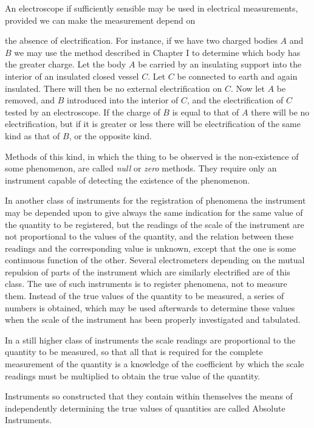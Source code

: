 \documentclass[11pt,a4paper]{article}
\begin{document}
An electroscope if sufficiently sensible may be used in electrical
measurements, provided we can make the measurement depend on

\clearpage

the absence of electrification. For instance, if we have two charged
bodies $A$ and $B$ we may use the method described in Chapter I to
determine which body has the greater charge. Let the body $A$ be
carried by an insulating support into the interior of an insulated
closed vessel $C$. Let $C$ be connected to earth and again insulated.
There will then be no external electrification on $C$. Now let $A$
be removed, and $B$ introduced into the interior of $C$, and the
electrification of $C$ tested by an electroscope. If the charge of $B$
is equal to that of $A$ there will be no electrification, but if it is
greater or less there will be electrification of the same kind as that
of $B$, or the opposite kind.

Methods of this kind, in which the thing to be observed is the
non-existence of some phenomenon, are called \textit{null} or \textit{zero}
methods. They require only an instrument capable of detecting the
existence of the phenomenon.

In another class of instruments for the registration of phenomena
the instrument may be depended upon to give always the same
indication for the same value of the quantity to be registered, but
the readings of the scale of the instrument are not proportional
to the values of the quantity, and the relation between these
readings and the corresponding value is unknown, except that the
one is some continuous function of the other. Several electrometers
depending on the mutual repulsion of parts of the instrument which
are similarly electrified are of this class. The use of such instruments
is to register phenomena, not to measure them. Instead of the true
values of the quantity to be measured, a series of numbers is obtained,
which may be used afterwards to determine these values when the scale
of the instrument has been properly investigated and tabulated.

In a still higher class of instruments the scale readings are
proportional to the quantity to be measured, so that all that is
required for the complete measurement of the quantity is a knowledge
of the coefficient by which the scale readings must be multiplied to
obtain the true value of the quantity.

Instruments so constructed that they contain within themselves
the means of independently determining the true values of quantities
are called Absolute Instruments.
\end{document}
